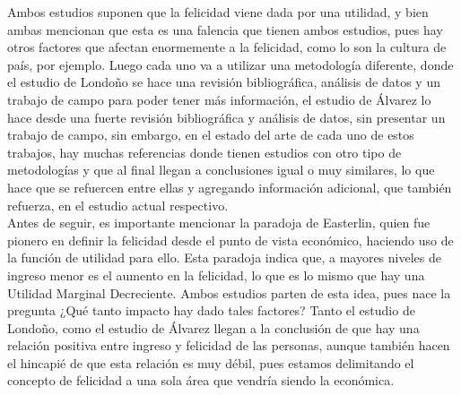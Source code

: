 Ambos estudios suponen que la felicidad viene dada por una utilidad, y bien ambas mencionan que esta es una falencia que tienen ambos estudios, pues hay otros factores que afectan enormemente a la felicidad, como lo son la cultura de país, por ejemplo. Luego cada uno va a utilizar una metodología diferente, donde el estudio de Londoño se hace una revisión bibliográfica, análisis de datos y un trabajo de campo para poder tener más información, el estudio de Álvarez lo hace desde una fuerte revisión bibliográfica y análisis de datos, sin presentar un trabajo de campo, sin embargo, en el estado del arte de cada uno de estos trabajos, hay muchas referencias donde tienen estudios con otro tipo de metodologías y que al final llegan a conclusiones igual o muy similares, lo que hace que se refuercen entre ellas y agregando información adicional, que también refuerza, en el estudio actual respectivo. \\

Antes de seguir, es importante mencionar la paradoja de Easterlin, quien fue pionero en definir la felicidad desde el punto de vista económico, haciendo uso de la función de utilidad para ello. Esta paradoja indica que, a mayores niveles de ingreso menor es el aumento en la felicidad, lo que es lo mismo que hay una Utilidad Marginal Decreciente. Ambos estudios parten de esta idea, pues nace la pregunta ¿Qué tanto impacto hay dado tales factores? Tanto el estudio de Londoño, como el estudio de Álvarez llegan a la conclusión de que hay una relación positiva entre ingreso y felicidad de las personas, aunque también hacen el hincapié de que esta relación es muy débil, pues estamos delimitando el concepto de felicidad a una sola área que vendría siendo la económica.\\



\newpage

